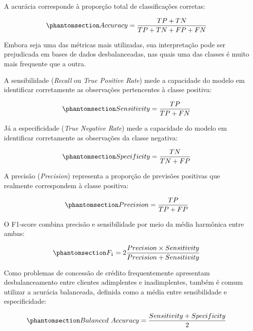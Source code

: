 \documentclass[
  brazilian,
  12pt,
  letterpaper,
  DIV=11,
  numbers=noendperiod]{scrartcl}
\begin{document}
A acurácia corresponde à proporção total de classificações corretas:

\begin{equation}\protect\phantomsection\label{eq-accuracy}{
Accuracy=
\frac{TP+TN}
{TP+TN+FP+FN}
}\end{equation}

Embora seja uma das métricas mais utilizadas, sua interpretação pode ser
prejudicada em bases de dados desbalanceadas, nas quais uma das classes
é muito mais frequente que a outra.

A sensibilidade (\emph{Recall} ou \emph{True Positive Rate}) mede a
capacidade do modelo em identificar corretamente as observações
pertencentes à classe positiva:

\begin{equation}\protect\phantomsection\label{eq-sensitivity}{
Sensitivity=
\frac{TP}
{TP+FN}
}\end{equation}

Já a especificidade (\emph{True Negative Rate}) mede a capacidade do
modelo em identificar corretamente as observações da classe negativa:

\begin{equation}\protect\phantomsection\label{eq-specificity}{
Specificity=
\frac{TN}
{TN+FP}
}\end{equation}

A precisão (\emph{Precision}) representa a proporção de previsões
positivas que realmente correspondem à classe positiva:

\begin{equation}\protect\phantomsection\label{eq-precision}{
Precision=
\frac{TP}
{TP+FP}
}\end{equation}

O F1-score combina precisão e sensibilidade por meio da média harmônica
entre ambas:

\begin{equation}\protect\phantomsection\label{eq-f1}{
F_1=
2
\frac{Precision\times Sensitivity}
{Precision+Sensitivity}
}\end{equation}

Como problemas de concessão de crédito frequentemente apresentam
desbalanceamento entre clientes adimplentes e inadimplentes, também é
comum utilizar a acurácia balanceada, definida como a média entre
sensibilidade e especificidade:

\begin{equation}\protect\phantomsection\label{eq-balanced-accuracy}{
Balanced\ Accuracy=
\frac{Sensitivity+Specificity}{2}
}\end{equation}
\end{document}
